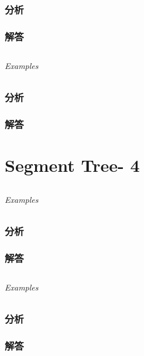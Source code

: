 \documentclass[UTF8,a4paper,12pt]{ctexbook}
\begin{document}
	\subsection{分析}
	
	\subsection{解答}
	
\section{}
	
	\subparagraph{Examples}
	
	\subsection{分析}
	
	\subsection{解答}
	
\chapter{Segment Tree- 4}
\section{}
	
	\subparagraph{Examples}
	
	\subsection{分析}
	
	\subsection{解答}
	
\section{}
	
	\subparagraph{Examples}
	
	\subsection{分析}
	
	\subsection{解答}
	
\end{document}
